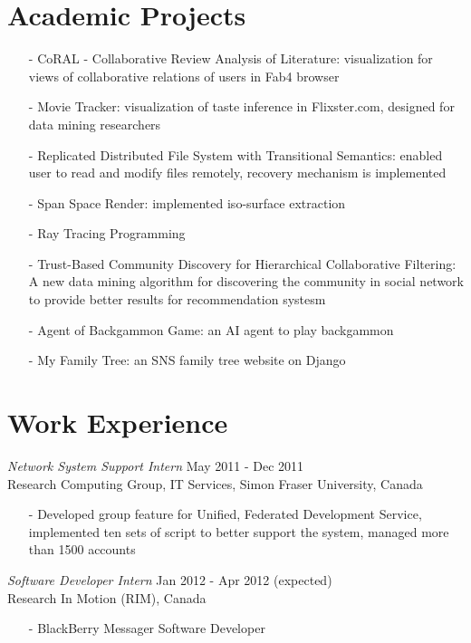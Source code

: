 \documentclass[line,margin]{res}
\begin{document}
\begin{resume}
    
\section{Academic Projects}
    \begin{itemize} \itemsep -2pt 
	  \setlength{\itemindent}{-1.5em}
	    \item[-] CoRAL - Collaborative Review Analysis of Literature: visualization for views of collaborative relations of users in Fab4 browser
        \item[-] Movie Tracker: visualization of taste inference in Flixster.com, designed for data mining researchers
        \item[-] Replicated Distributed File System with Transitional Semantics: enabled user to read and modify files remotely, recovery mechanism is implemented
        \item[-] Span Space Render: implemented iso-surface extraction 
		\item[-] Ray Tracing Programming
		\item[-] Trust-Based Community Discovery for Hierarchical Collaborative Filtering: A new data mining algorithm for discovering the community in social network to provide better results for recommendation systesm
		\item[-] Agent of Backgammon Game: an AI agent to play backgammon
		\item[-] My Family Tree: an SNS family tree website on Django
	\end{itemize}

\section {Work Experience}
    {\sl Network System Support Intern} \hfill May 2011 - Dec 2011 \\
	Research Computing Group, IT Services, Simon Fraser University, Canada 
	\begin{itemize} \itemsep -2pt
	    \item[-] Developed group feature for Unified, Federated Development Service, implemented ten sets of script to better support the system, managed more than 1500 accounts
	\end{itemize}
	\vspace{-1.3em}
	{\sl Software Developer Intern} \hfill Jan 2012 - Apr 2012 (expected)\\
	Research In Motion (RIM), Canada
	\begin{itemize} \itemsep -2pt
        \item[-] BlackBerry Messager Software Developer
	\end{itemize}
	


\end{resume}
\end{document}

